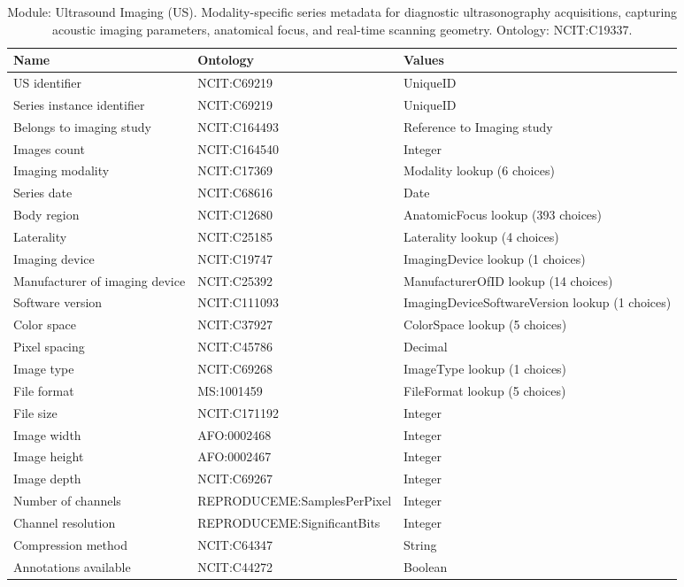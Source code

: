 \documentclass{article}
\begin{document}
\begin{table}[htb]
\begin{tabular}{lll}
Name & Ontology & Values \\
\hline
US identifier & NCIT:C69219 & UniqueID \\
Series instance identifier & NCIT:C69219 & UniqueID \\
Belongs to imaging study & NCIT:C164493 & Reference to Imaging study \\
Images count & NCIT:C164540 & Integer \\
Imaging modality & NCIT:C17369 & Modality lookup (6 choices) \\
Series date & NCIT:C68616 & Date \\
Body region & NCIT:C12680 & AnatomicFocus lookup (393 choices) \\
Laterality & NCIT:C25185 & Laterality lookup (4 choices) \\
Imaging device & NCIT:C19747 & ImagingDevice lookup (1 choices) \\
Manufacturer of imaging device & NCIT:C25392 & ManufacturerOfID lookup (14 choices) \\
Software version & NCIT:C111093 & ImagingDeviceSoftwareVersion lookup (1 choices) \\
Color space & NCIT:C37927 & ColorSpace lookup (5 choices) \\
Pixel spacing & NCIT:C45786 & Decimal \\
Image type & NCIT:C69268 & ImageType lookup (1 choices) \\
File format & MS:1001459 & FileFormat lookup (5 choices) \\
File size & NCIT:C171192 & Integer \\
Image width & AFO:0002468 & Integer \\
Image height & AFO:0002467 & Integer \\
Image depth & NCIT:C69267 & Integer \\
Number of channels & REPRODUCEME:SamplesPerPixel & Integer \\
Channel resolution & REPRODUCEME:SignificantBits & Integer \\
Compression method & NCIT:C64347 & String \\
Annotations available & NCIT:C44272 & Boolean \\
\hline
\end{tabular}
\caption[Module: Ultrasound Imaging (US)]{\label{table:table20} Module: Ultrasound Imaging (US). Modality-specific series metadata for diagnostic ultrasonography acquisitions, capturing acoustic imaging parameters, anatomical focus, and real-time scanning geometry. Ontology: NCIT:C19337. }
\end{table}
\end{document}
